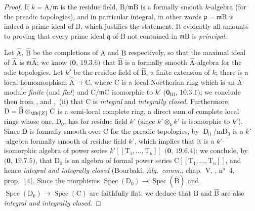 \begin{proof}
If $k=\mathrm{A}/\mathfrak{m}$ is the residue field, $\mathrm{B}/\mathfrak{m}\mathrm{B}$ is a formally smooth $k$-algebra (for the preadic topologies), and in particular integral, in other words $\mathfrak{p}=\mathfrak{m}\mathrm{B}$ is indeed a prime ideal of $\mathrm{B}$, which justifies the statement.
It evidently all amounts to proving that every prime ideal $\mathfrak{q}$ of $\mathrm{B}$ not contained in $\mathfrak{m}\mathrm{B}$ is \emph{principal}.

Let $\widehat{\mathrm{A}}$, $\widehat{\mathrm{B}}$ be the completions of $\mathrm{A}$ and $\mathrm{B}$ respectively, so that the maximal ideal of $\widehat{\mathrm{A}}$ is $\mathfrak{m}\widehat{\mathrm{A}}$; we know $(\mathbf{0}$, $19.3.6)$ that $\widehat{\mathrm{B}}$ is a formally smooth $\widehat{\mathrm{A}}$-algebra for the adic topologies.
Let $k'$ be the residue field of $\widehat{\mathrm{B}}$, a finite extension of $k$; there is a local homomorphism $\widehat{\mathrm{A}}\to\mathrm{C}$, where $\mathrm{C}$ is a local Noetherian ring which is an $\widehat{\mathrm{A}}$-module \emph{finite} (and \emph{flat}) and $\mathrm{C}/\mathfrak{m}\mathrm{C}$ isomorphic to $k'$ $(\mathbf{0}_{\mathrm{III}}$, $10.3.1)$; we conclude then from ,  and ,~(ii) that $\mathrm{C}$ is \emph{integral} and \emph{integrally closed}.
Furthermore, $\mathrm{D}=\widehat{\mathrm{B}}\otimes_{\bb{Z}}\mathrm{C}$ is a semi-local complete ring, a direct sum of complete local rings whose one, $\mathrm{D}_0$, has for residue field $k'$ (since $k'\otimes_k k'$ is isomorphic to $k'$).
Since $\mathrm{D}$ is formally smooth over $\mathrm{C}$ for the preadic topologies; by $\operatorname{D}_0/\mathrm{m}\mathrm{D}_0$ is a $k'$-algebra formally smooth of residue field $k'$, which implies that it is a $k'$-isomorphic algebra of power series $k'[[\mathrm{T}_1,\ldots,\mathrm{T}_n]]$ $(\mathbf{0}$, $19.6.4)$; we conclude, by $(\mathbf{0}$, $19.7.5)$, that $\mathrm{D}_0$ is an algebra of formal power series $\mathrm{C}[[\mathrm{T}_1,\ldots,\mathrm{T}_n]]$, and hence \emph{integral and integrally closed} (Bourbaki, \emph{Alg.\ comm.}, chap.~V, , n$^{\mathrm{o}}$~4, prop.~14).
Since the morphisms $\operatorname{Spec}(\mathrm{D}_0)\to\operatorname{Spec}(\widehat{\mathrm{B}})$ and $\operatorname{Spec}(\mathrm{D}_0)\to\operatorname{Spec}(\mathrm{C})$ are faithfully flat, we deduce that $\mathrm{B}$ and $\widehat{\mathrm{B}}$ are also \emph{integral and integrally closed}.

\end{proof}
